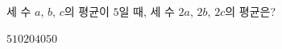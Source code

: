 세 수 $a$, $b$, $c$의 평균이 $5$일 때, 세 수 $2a$, $2b$, $2c$의 평균은?
\begin{choices32}{$5$}{$10$}{$20$}{$40$}{$50$}\end{choices32}
